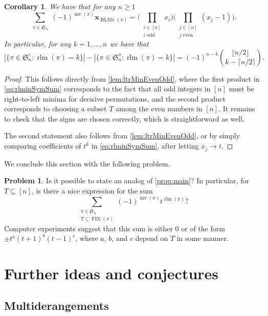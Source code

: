 \documentclass[reqno]{amsart}
\newtheorem{corollary}[theorem]{Corollary}
\theoremstyle{definition}
\newtheorem{problem}[theorem]{Problem}
\newcommand{\xvec}{\mathbf{x}}
\newcommand{\symS}{\mathfrak{S}}
\DeclareMathOperator{\inv}{inv}
\DeclareMathOperator{\FIX}{FIX}
\DeclareMathOperator{\rlm}{rlm}
\DeclareMathOperator{\RLMv}{RLMv}
\begin{document}
\begin{corollary}\label{cor:rlminsum}
We have that for any $n\geq 1$
\begin{equation}\label{eq:rlminSymSum}
 \sum_{\substack{\pi \in \symS_n   }} (-1)^{\inv(\pi)} \xvec_{\RLMv(\pi)}
 = 
	\big(\prod_{\substack{i \in [n] \\ i \text{ odd}}} x_i\big)
	\big(\prod_{\substack{j \in [n] \\ j \text{ even}}} (x_j-1)\big).
\end{equation}
In particular, for any $k = 1,\dotsc,n$ we have that
\[
 |\{ \pi \in \symS^e_n : \rlm(\pi)=k \}| - 
 |\{ \pi \in \symS^o_n : \rlm(\pi)=k \}| = (-1)^{n-k}
 \binom{ \lfloor n/2 \rfloor }{k - \lceil n/2 \rceil}.
\]
\end{corollary}
\begin{proof}
This follows directly from \cref{lem:ltrMinEvenOdd},
where the first product in \eqref{eq:rlminSymSum}
corresponds to the fact that all odd integers in $[n]$ must be 
right-to-left minima for decisive permutations,
and the second product corresponds to choosing a
subset $T$ among the even numbers in $[n]$.
It remains to check that the signs are chosen correctly,
which is straightforward as well.

The second statement also follows from \cref{lem:ltrMinEvenOdd},
or by simply comparing coefficients of $t^k$ in \eqref{eq:rlminSymSum},
after letting $x_j \to t$.
\end{proof}


We conclude this section with the following problem.
\begin{problem}
Is it possible to state an analog of \cref{prop:main}?
In particular, for $T \subseteq [n]$, is there a nice expression for the sum
\[
 \sum_{\substack{\pi \in \symS_n  \\ T \subseteq \FIX(\pi) }}(-1)^{\inv(\pi)} t^{\rlm(\pi)}  ?
\]
Computer experiments suggest that this sum is either $0$ or of the form 
$\pm t^a (t+1)^b (t-1)^c$, where $a$, $b$, and $c$ depend on $T$ in some manner.
\end{problem}



\section{Further ideas and conjectures}


\subsection{Multiderangements}
\end{document}
